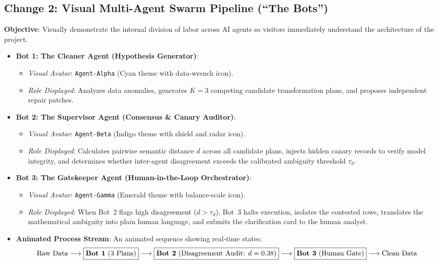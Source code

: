 \documentclass[11pt,a4paper]{article}
\begin{document}
\subsection{Change 2: Visual Multi-Agent Swarm Pipeline (``The Bots'')}
\textbf{Objective}: Visually demonstrate the internal division of labor across AI agents so visitors immediately understand the architecture of the project.
\begin{itemize}[leftmargin=*]
    \item \textbf{Bot 1: The Cleaner Agent (Hypothesis Generator)}:
    \begin{itemize}
        \item \textit{Visual Avatar}: \texttt{Agent-Alpha} (Cyan theme with data-wrench icon).
        \item \textit{Role Displayed}: Analyzes data anomalies, generates $K=3$ competing candidate transformation plans, and proposes independent repair patches.
    \end{itemize}
    \item \textbf{Bot 2: The Supervisor Agent (Consensus \& Canary Auditor)}:
    \begin{itemize}
        \item \textit{Visual Avatar}: \texttt{Agent-Beta} (Indigo theme with shield and radar icon).
        \item \textit{Role Displayed}: Calculates pairwise semantic distance $d$ across all candidate plans, injects hidden canary records to verify model integrity, and determines whether inter-agent disagreement exceeds the calibrated ambiguity threshold $\tau_d$.
    \end{itemize}
    \item \textbf{Bot 3: The Gatekeeper Agent (Human-in-the-Loop Orchestrator)}:
    \begin{itemize}
        \item \textit{Visual Avatar}: \texttt{Agent-Gamma} (Emerald theme with balance-scale icon).
        \item \textit{Role Displayed}: When Bot~2 flags high disagreement ($d > \tau_d$), Bot~3 halts execution, isolates the contested rows, translates the mathematical ambiguity into plain human language, and submits the clarification card to the human analyst.
    \end{itemize}
    \item \textbf{Animated Process Stream}: An animated sequence showing real-time states:
    $$\text{Raw Data} \longrightarrow \fbox{\textbf{Bot 1} (3 Plans)} \longrightarrow \fbox{\textbf{Bot 2} (Disagreement Audit: $d=0.38$)} \longrightarrow \fbox{\textbf{Bot 3} (Human Gate)} \longrightarrow \text{Clean Data}$$
\end{itemize}
\end{document}
